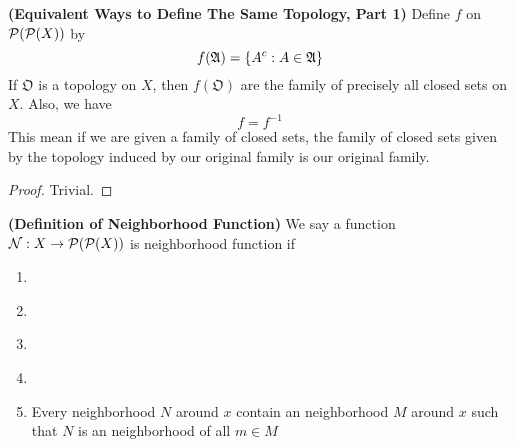\documentclass{report}
\begin{document}
\begin{theorem}
\label{2.1.3}
\textbf{(Equivalent Ways to Define The Same Topology, Part 1)} Define $f$ on $\mathcal{P}(\mathcal{P}(X))$ by 
\begin{equation}
f(\mathfrak{A})=\{ A^c:A\in \mathfrak{A} \}
\end{equation}
If $\mathfrak{O}$ is a topology on $X$, then  $f(\mathfrak{O})$ are the family of precisely all closed sets on $X$. Also, we have
\begin{equation}
f=f^{-1}
\end{equation}
This mean if we are given a family of closed sets, the family of closed sets given by the topology induced by our original family is our original family.   
\end{theorem}
\begin{proof}
Trivial. 
\end{proof}
\begin{definition}
\label{2.1.4}
\textbf{(Definition of Neighborhood Function)} We say a function $\mathcal{N}:X\rightarrow \mathcal{P}(\mathcal{P}(X))$ is neighborhood function if 
\begin{enumerate}[label=(\alph*)]
  \item {}\\
  \item {}\\
  \item {}\\
  \item {}\\
  \item Every neighborhood $N$ around $x$ contain an neighborhood $M$ around $x$ such that $N$ is an neighborhood of all $m \in M$
\end{enumerate}
\end{definition}
\end{document}

